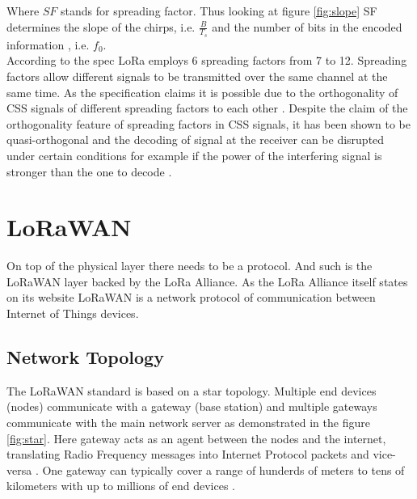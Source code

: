 Where $SF$ stands for spreading factor. Thus looking at figure \ref{fig:slope} SF determines the slope of the chirps, i.e. $\frac{B}{T_s}$ and the number of bits in the encoded information \cite{sf_article}, i.e. $f_0$.\\

According to the spec \cite{semtech_spec} LoRa employs 6 spreading factors from 7 to 12. Spreading factors allow different signals to be transmitted over the same channel at the same time. As the specification claims it is possible due to the orthogonality of CSS signals of different spreading factors to each other \cite{semtech_spec}.
Despite the claim of the orthogonality feature of spreading factors in CSS signals, it has been shown to be quasi-orthogonal and the decoding of signal at the receiver can be disrupted under certain conditions for example if the power of the interfering signal is stronger than the one to decode \cite{imperfect_1}.

\section{LoRaWAN}

On top of the physical layer there needs to be a protocol. And such is the LoRaWAN layer backed by the LoRa Alliance. As the LoRa Alliance itself states on its website \cite{lora_alliance_about_lorawan} LoRaWAN is a network protocol of communication between Internet of Things devices.

\subsection{Network Topology}

The LoRaWAN standard is based on a star topology.
Multiple end devices (nodes) communicate with a gateway (base station) and multiple gateways communicate with the main network server as demonstrated in the figure \ref{fig:star}. Here gateway acts as an agent between the nodes and the internet, translating Radio Frequency messages into Internet Protocol packets and vice-versa \cite{lora_alliance_about_lorawan}.
One gateway can typically cover a range of hunderds of meters to tens of kilometers with up to millions of end devices \cite{doppler}.

